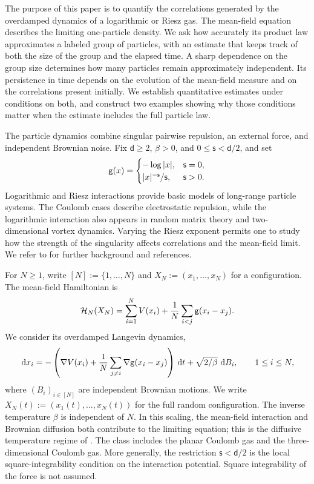 \documentclass[11pt,reqno]{amsart}
\numberwithin{equation}{section}
\theoremstyle{plain}
\theoremstyle{remark}
\renewcommand{\d}{\mathsf{d}}\newcommand{\s}{\mathsf{s}}
\begin{document}
The purpose of this paper is to quantify the correlations generated by the overdamped dynamics of a logarithmic or Riesz gas. The mean-field equation describes the limiting one-particle density. We ask how accurately its product law approximates a labeled group of particles, with an estimate that keeps track of both the size of the group and the elapsed time. A sharp dependence on the group size determines how many particles remain approximately independent. Its persistence in time depends on the evolution of the mean-field measure and on the correlations present initially. We establish quantitative estimates under conditions on both, and construct two examples showing why those conditions matter when the estimate includes the full particle law.


The particle dynamics combine singular pairwise repulsion, an external force, and independent Brownian noise. Fix $\d\ge2$, $\beta>0$, and $0\le\s<\d/2$, and set
\begin{equation}\label{eq:kernel}
 \g(x)=\begin{cases}-\log|x|,&\s=0,\\ |x|^{-\s}/\s,&\s>0.\end{cases}
\end{equation}
Logarithmic and Riesz interactions provide basic models of long-range particle systems. The Coulomb cases describe electrostatic repulsion, while the logarithmic interaction also appears in random matrix theory and two-dimensional vortex dynamics. Varying the Riesz exponent permits one to study how the strength of the singularity affects correlations and the mean-field limit. We refer to \cite{SerfatyBook,RSdiffusive,RSselfsimilar} for further background and references.



For $N\ge1$, write $[N]:=\{1,\ldots,N\}$ and $X_N:=(x_1,\ldots,x_N)$ for a configuration. The mean-field Hamiltonian is
\begin{equation}\label{eq:intro-hamiltonian}
 \mathcal H_N(X_N)=\sum_{i=1}^N V(x_i)+\frac1N\sum_{i<j}\mathsf g(x_i-x_j).
\end{equation}
We consider its overdamped Langevin dynamics,
\begin{equation}\label{eq:sde}
 \,\mathrm d x_i=-\left(\nabla V(x_i)+\frac1N\sum_{j\ne i}\nabla\mathsf g(x_i-x_j)\right)\,\mathrm d t
            +\sqrt{2/\beta}\,\,\mathrm d B_i,\qquad 1\le i\le N,
\end{equation}
where $(B_i)_{i\in[N]}$ are independent Brownian motions. We write $X_N(t):=(x_1(t),\ldots,x_N(t))$ for the full random configuration. The inverse temperature $\beta$ is independent of $N$. In this scaling, the mean-field interaction and Brownian diffusion both contribute to the limiting equation; this is the diffusive temperature regime of \cite{DGRpartition}. The class includes the planar Coulomb gas and the three-dimensional Coulomb gas. More generally, the restriction $\s<\d/2$ is the local square-integrability condition on the interaction potential. Square integrability of the force is not assumed.
\end{document}
